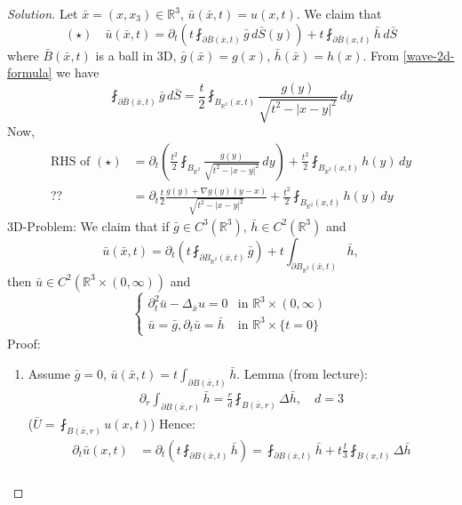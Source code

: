 \documentclass{report}
\theoremstyle{tommy}
\begin{document}
  \begin{proof}[Solution]
    Let \(\bar x = (x, x_3) \in \mathbb{R}^3\), \(\bar u(\bar x, t) = u(x,t)\). We claim that 
    \[(\star) \quad \bar u(\bar x, t) = \partial_t \left(t \fint_{\partial \bar B(\bar x, t)} \bar g \, d\bar S(y) \right) + t \fint_{\partial \bar B(x,t)}\bar h \, d \bar S\]
    where \(\bar B(\bar x, t)\) is a ball in 3D, \(\bar g(\bar x) = g(x)\), \(\bar h(\bar x) = h(x)\). From \ref{wave-2d-formula} we have 
    \[\fint_{\partial \bar B(\bar x, t)} \bar g \, d \bar S = \frac{t}{2} \fint_{B_{\mathbb{R}^2}(x,t)} \frac{g(y)}{\sqrt{t^2 - |x-y|^2}} \, dy\]
    Now,
    \begin{align*}
      \text{RHS of \((\star)\)}  &= \partial_t \left(\frac{t^2}{2} \fint_{B_{\mathbb{R}^2}} \frac{g(y)}{\sqrt{t^2 - |x-y|^2}} \, dy\right) + \frac{t^2}{2}\fint_{B_{\mathbb{R}^2}(x,t)} h(y) \, dy \\
      ?? \quad &= \partial_t \frac{t}{2} \frac{g(y) + \nabla g(y) (y-x)}{\sqrt{t^2-|x-y|^2}}+ \frac{t^2}{2}\fint_{B_{\mathbb{R}^2}(x,t)} h(y) \, dy
    \end{align*}
    3D-Problem: We claim that if \(\bar g \in C^3(\mathbb{R}^3)\), \(\bar h \in C^2(\mathbb{R}^3)\) and 
    \[\bar u(\bar x, t) = \partial_t \left(t \fint_{\partial B_{\mathbb{R}^2}(\bar x , t)}\bar g\right) + t \int_{\partial B_{\mathbb{R}^2}(\bar x, t)} \bar h,\]
    then \(\bar u \in C^2(\mathbb{R}^3 \times (0,\infty))\) and 
    \[\begin{cases}
      \partial_t^2 \bar u - \Delta_{\bar x} u = 0 &\text{in } \mathbb{R}^3 \times (0,\infty) \\
      \bar u = \bar g, \partial_t \bar u = \bar h &\text{in } \mathbb{R}^3 \times \{t = 0\}
    \end{cases}\]
    Proof: 
      \begin{enumerate}[label=Step \arabic*:]
        \item Assume \(\bar g = 0\), \(\bar u (\bar x, t) = t \int_{\partial B(\bar x, t)} \bar h.\) Lemma (from lecture): 
        \begin{align*}
          \partial_r \int_{\partial B(\bar x, r)} \bar h = \frac{r}{d} \fint_{B(\bar x, r)} \Delta \bar h, \quad d = 3
        \end{align*}
        (\(\bar U = \fint_{B(\bar x, r)} u(x,t)\))
        Hence:
        \begin{align*}
          \partial_t \bar u(x,t) &= \partial_t \left(t \fint_{\partial B(\bar x, t)} \bar h\right) = \fint_{\partial B(\bar x, t)} \bar h + t \frac{t}{3}\fint_{B(x,t)} \Delta \bar h \\

\end{align*}
\end{enumerate}
\end{proof}
\end{document}
